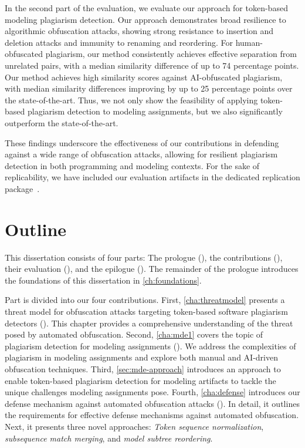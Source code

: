 In the second part of the evaluation, we evaluate our approach for token-based modeling plagiarism detection.
Our approach demonstrates broad resilience to algorithmic obfuscation attacks, showing strong resistance to insertion and deletion attacks and immunity to renaming and reordering.
For human-obfuscated plagiarism, our method consistently achieves effective separation from unrelated pairs, with a median similarity difference of up to 74 percentage points.
Our method achieves high similarity scores against AI-obfuscated plagiarism, with median similarity differences improving by up to 25 percentage points over the state-of-the-art.
Thus, we not only show the feasibility of applying token-based plagiarism detection to modeling assignments, but we also significantly outperform the state-of-the-art.

These findings underscore the effectiveness of our contributions in defending against a wide range of obfuscation attacks, allowing for resilient plagiarism detection in both programming and modeling contexts.
For the sake of replicability, we have included our evaluation artifacts in the dedicated replication package~.



\section{Outline}
This dissertation consists of four parts: The prologue (), the contributions (), their evaluation (), and the epilogue ().
%
The remainder of the prologue introduces the foundations of this dissertation in \autoref{ch:foundations}.

Part  is divided into our four contributions.
First, \autoref{cha:threatmodel} presents a threat model for obfuscation attacks targeting token-based software plagiarism detectors (). This chapter provides a comprehensive understanding of the threat posed by automated obfuscation.
Second, \autoref{cha:mde1} covers the topic of plagiarism detection for modeling assignments (). We address the complexities of plagiarism in modeling assignments and explore both manual and AI-driven obfuscation techniques.
Third, \autoref{sec:mde-approach} introduces an approach to enable token-based plagiarism detection for modeling artifacts to tackle the unique challenges modeling assignments pose.
Fourth, \autoref{cha:defense} introduces our defense mechanism against automated obfuscation attacks (). In detail, it outlines the requirements for effective defense mechanisms against automated obfuscation. Next, it presents three novel approaches: \textit{Token sequence normalization}, \textit{subsequence match merging}, and \textit{model subtree reordering}.


